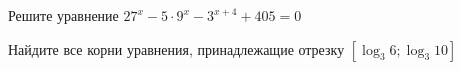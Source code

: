 \begin{ex}
	\begin{condition}
		\begin{enumcols}[label=\asbuk*)]
			\item Решите уравнение \( 27^x - 5\cdot 9^x -3^{x+4} + 405 = 0  \)
			\item Найдите все корни уравнения, принадлежащие отрезку \( \left[\log_3 6;\log_3 10\right] \)
		\end{enumcols}
	\end{condition}
\end{ex}
